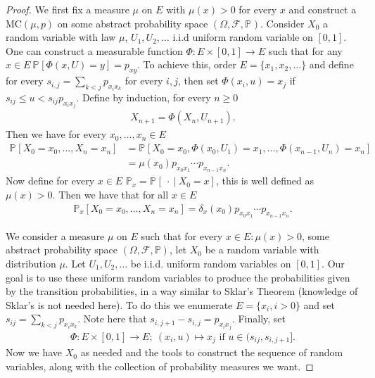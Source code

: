 \begin{proof}
	We first fix a measure $\mu $ on $E$ with $\mu (x)>0$ for every $x$ and construct a MC$(\mu,p)$ on some abstract probability space $(\Omega, \mathcal{F}, \mathbb{P}_{})$. Consider $X_0$ a random variable with law $\mu $, $U_1, U_2, \ldots$ i.i.d uniform random variable on  $[0,1]$. One can construct a measurable function $\Phi: E \times [0,1] \to E$ such that for any  $x \in E\ \mathbb{P}_{} \left[ \Phi(x,U)=y \right] = p_{xy}$. To achieve this, order $E=\{x_1, x_2, \ldots \}$ and define for every  $s_{i,j} = \sum_{k<j}^{} p_{x_ix_k}$ for every $i, j$, then set $\Phi(x_i, u) = x_j$ if $s_{ij}\leq u < s_{ij} p_{x_ix_j}$. Define by induction, for every $n\geq 0$ 
	\begin{align}
		X_{n+1} = \Phi(X_n, U_{n+1}).
	\end{align}
Then we have for every $x_0, \ldots, x_n \in E$ 
\begin{align}
	\mathbb{P}_{} \left[ X_0=x_0, \ldots ,X_n=x_n \right] &=
		\mathbb{P}_{} \left[ X_0=x_0, \Phi(x_0, U_1)=x_1 , \ldots , \Phi(x_{n-1}, U_{n}) = x_n \right] \\
	&= \mu(x_0)p_{x_0x_1} \cdots p_{x_{n-1}x_n}
.\end{align}
Now define for every $x \in E$ $\mathbb{P}_{x}  = \mathbb{P}_{} \left[\ \cdot \ | \ X_0 = x \right] $, this is well defined as $\mu (x)>0$. Then we have that for all $x \in E$ 
\begin{align}
	\mathbb{P}_{x} \left[ X_0 = x_0, \ldots, X_n = x_n \right] = \delta_x(x_0) p_{x_0 x_1} \cdots p_{x_{n-1}x_n}.
\end{align}

{\color{blue}
We consider a measure $\mu $ on $E$ such that for every $x \in E: \mu (x) >0$, some abstract probability space $(\Omega, \mathcal{F}, \mathbb{P} )$, let $X_0$ be a random variable with distribution $\mu $. Let $U_1,U_2, \ldots $ be i.i.d. uniform  random variables on $[0,1]$. Our goal is to use these uniform random variables to produce the probabilities given by the transition probabilities, in a way similar to Sklar's Theorem (knowledge of Sklar's is not needed here). To do this we enumerate $E=\{x_i, i> 0 \}$ and set $s_{ij}= \sum_{k<j}p_{x_ix_k} $. Note here that $s_{i,j+1}-s_{i,j} = p_{x_ix_j} $. Finally, set
\begin{align}
	\Phi: E \times [0,1] \to E;\ (x_i,u) \mapsto x_j \textrm{ if } u \in (s_{ij}, s_{i,j+1}]
.\end{align}
Now we have $X_0$ as needed and the tools to construct the sequence of random variables, along with the collection of probability measures we want.

}
\end{proof}
